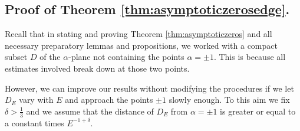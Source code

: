 \documentclass[pdftex]{sigma}
\numberwithin{equation}{section}
\newcommand{\al}{\alpha}
\begin{document}
\subsection{Proof of Theorem \ref{thm:asymptoticzerosedge}.}\label{sub:thm2}
Recall that in stating and proving Theorem \ref{thm:asymptoticzeros} and all necessary preparatory lemmas and propositions,
we worked with a compact subset $D$ of the
$\al$-plane not containing the points $\al=\pm1$. This is because all estimates involved break down at those two points.

However, we can improve our results without modifying the procedures if we let $D_E$ vary with $E$ and approach the points $\pm1 $
slowly enough. To this aim we f\/ix $\delta>\frac13$ and we assume that the distance of $D_E$ from $\al= \pm1$ is greater
or equal to a constant times $E^{-1+\delta}$.
\end{document}
